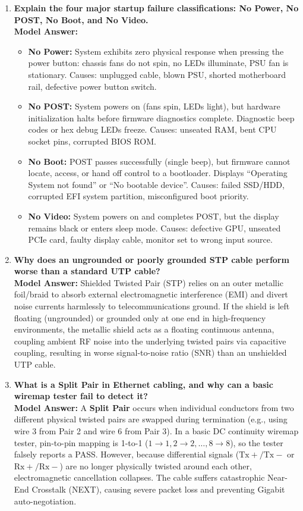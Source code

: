 \begin{enumerate}[leftmargin=*,label=\textbf{Q\arabic*.}]
    \item \textbf{Explain the four major startup failure classifications: No Power, No POST, No Boot, and No Video.} \\
    \textbf{Model Answer:}
    \begin{itemize}
        \item \textbf{No Power:} System exhibits zero physical response when pressing the power button: chassis fans do not spin, no LEDs illuminate, PSU fan is stationary. Causes: unplugged cable, blown PSU, shorted motherboard rail, defective power button switch.
        \item \textbf{No POST:} System powers on (fans spin, LEDs light), but hardware initialization halts before firmware diagnostics complete. Diagnostic beep codes or hex debug LEDs freeze. Causes: unseated RAM, bent CPU socket pins, corrupted BIOS ROM.
        \item \textbf{No Boot:} POST passes successfully (single beep), but firmware cannot locate, access, or hand off control to a bootloader. Displays ``Operating System not found'' or ``No bootable device''. Causes: failed SSD/HDD, corrupted EFI system partition, misconfigured boot priority.
        \item \textbf{No Video:} System powers on and completes POST, but the display remains black or enters sleep mode. Causes: defective GPU, unseated PCIe card, faulty display cable, monitor set to wrong input source.
    \end{itemize}

    \item \textbf{Why does an ungrounded or poorly grounded STP cable perform worse than a standard UTP cable?} \\
    \textbf{Model Answer:} Shielded Twisted Pair (STP) relies on an outer metallic foil/braid to absorb external electromagnetic interference (EMI) and divert noise currents harmlessly to telecommunications ground. If the shield is left floating (ungrounded) or grounded only at one end in high-frequency environments, the metallic shield acts as a floating continuous antenna, coupling ambient RF noise into the underlying twisted pairs via capacitive coupling, resulting in worse signal-to-noise ratio (SNR) than an unshielded UTP cable.

    \item \textbf{What is a Split Pair in Ethernet cabling, and why can a basic wiremap tester fail to detect it?} \\
    \textbf{Model Answer:} A \textbf{Split Pair} occurs when individual conductors from two different physical twisted pairs are swapped during termination (e.g., using wire 3 from Pair 2 and wire 6 from Pair 3). In a basic DC continuity wiremap tester, pin-to-pin mapping is 1-to-1 ($1\to 1, 2\to 2, \dots, 8\to 8$), so the tester falsely reports a PASS. However, because differential signals ($\text{Tx}+ / \text{Tx}-$ or $\text{Rx}+ / \text{Rx}-$) are no longer physically twisted around each other, electromagnetic cancellation collapses. The cable suffers catastrophic Near-End Crosstalk (NEXT), causing severe packet loss and preventing Gigabit auto-negotiation.


\end{enumerate}
